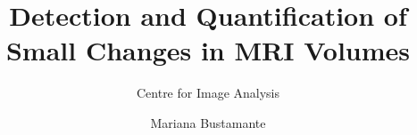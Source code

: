 \documentclass{UUThesisTemplate}
\title{Detection and Quantification of Small Changes in MRI Volumes}
\subtitle{Centre for Image Analysis}
\author{Mariana Bustamante}
\begin{document}
\frontmatter
    \frontmatterCS 
 
   \dedication{Dedicated to all hard-working \\doctoral students at Uppsala University}
 
    
    
    \begingroup
        \tableofcontents
    \endgroup
    

\mainmatter
     
     
     
     
     
     


\backmatter
    \nocite{*} %
    
    
\end{document}
